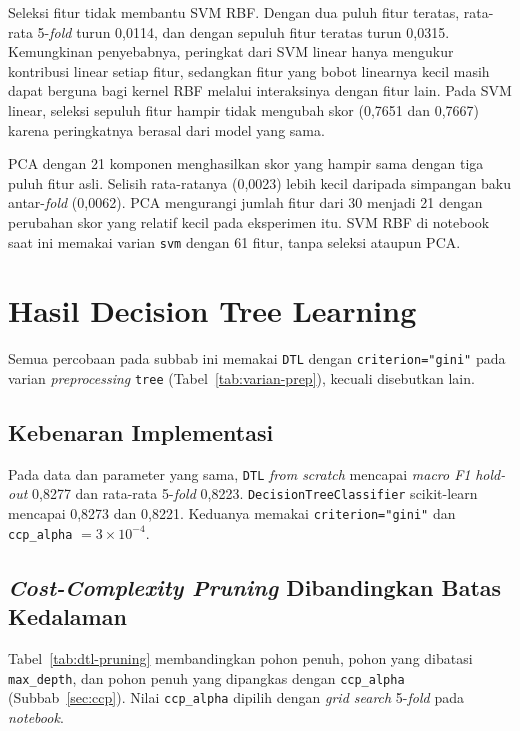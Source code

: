 Seleksi fitur tidak membantu SVM RBF. Dengan dua puluh fitur teratas, rata-rata
5-\textit{fold} turun 0,0114, dan dengan sepuluh fitur teratas turun 0,0315.
Kemungkinan penyebabnya, peringkat dari SVM linear hanya mengukur kontribusi
linear setiap fitur, sedangkan fitur yang bobot linearnya kecil masih dapat
berguna bagi kernel RBF melalui interaksinya dengan fitur lain. Pada SVM
linear, seleksi sepuluh fitur hampir tidak mengubah skor (0,7651 dan 0,7667)
karena peringkatnya berasal dari model yang sama.

PCA dengan 21 komponen menghasilkan skor yang hampir sama dengan tiga puluh fitur
asli. Selisih rata-ratanya (0,0023) lebih kecil daripada simpangan baku
antar-\textit{fold} (0,0062). PCA mengurangi jumlah fitur dari 30 menjadi 21 dengan perubahan skor yang
relatif kecil pada eksperimen itu. SVM RBF di notebook saat ini memakai varian
\texttt{svm} dengan 61 fitur, tanpa seleksi ataupun PCA.

\section{Hasil Decision Tree Learning}
\label{sec:hasil-dtl}

Semua percobaan pada subbab ini memakai \texttt{DTL} dengan
\texttt{criterion="gini"} pada varian \textit{preprocessing} \texttt{tree}
(Tabel~\ref{tab:varian-prep}), kecuali disebutkan lain.

\subsection{Kebenaran Implementasi}

Pada data dan parameter yang sama, \texttt{DTL} \textit{from scratch}
mencapai \textit{macro F1} \textit{hold-out} 0,8277 dan rata-rata
5-\textit{fold} 0,8223. \texttt{DecisionTreeClassifier} scikit-learn
mencapai 0,8273 dan 0,8221. Keduanya memakai \texttt{criterion="gini"}
dan \texttt{ccp\_alpha} $=3\times10^{-4}$.

\subsection{\textit{Cost-Complexity Pruning} Dibandingkan Batas Kedalaman}

Tabel~\ref{tab:dtl-pruning} membandingkan pohon penuh, pohon yang dibatasi
\texttt{max\_depth}, dan pohon penuh yang dipangkas dengan
\texttt{ccp\_alpha} (Subbab~\ref{sec:ccp}). Nilai \texttt{ccp\_alpha} dipilih
dengan \textit{grid search} 5-\textit{fold} pada \textit{notebook}.

